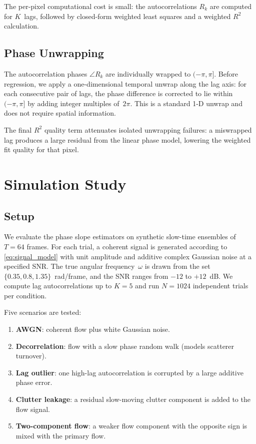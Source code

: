 \documentclass[11pt]{article}
\begin{document}
The per-pixel computational cost is small: the autocorrelations
$R_k$ are computed for $K$~lags, followed by closed-form weighted
least squares and a weighted $R^2$ calculation.

\subsection{Phase Unwrapping}
\label{sec:unwrapping}

The autocorrelation phases $\angle R_k$ are individually wrapped to
$(-\pi, \pi]$.  Before regression, we apply a one-dimensional temporal
unwrap along the lag axis: for each consecutive pair of lags, the
phase difference is corrected to lie within $(-\pi, \pi]$ by adding
integer multiples of~$2\pi$.  This is a standard 1-D unwrap and does
not require spatial information.

The final $R^2$ quality term attenuates isolated unwrapping failures:
a miswrapped lag produces a large residual from the linear phase model,
lowering the weighted fit quality for that pixel.


\section{Simulation Study}
\label{sec:simulations}

\subsection{Setup}

We evaluate the phase slope estimators on synthetic slow-time
ensembles of $T = 64$ frames.  For each trial, a coherent signal is
generated according to \cref{eq:signal_model} with unit amplitude and
additive complex Gaussian noise at a specified SNR.  The true angular
frequency~$\omega$ is drawn from the set $\{0.35, 0.8, 1.35\}$~rad/frame,
and the SNR ranges from $-12$ to $+12$~dB.  We compute lag
autocorrelations up to $K = 5$ and run $N = 1024$ independent trials
per condition.

Five scenarios are tested:
\begin{enumerate}
  \item \textbf{AWGN}: coherent flow plus white Gaussian noise.
  \item \textbf{Decorrelation}: flow with a slow phase random walk
    (models scatterer turnover).
  \item \textbf{Lag outlier}: one high-lag autocorrelation is
    corrupted by a large additive phase error.
  \item \textbf{Clutter leakage}: a residual slow-moving clutter
    component is added to the flow signal.
  \item \textbf{Two-component flow}: a weaker flow component with the
    opposite sign is mixed with the primary flow.
\end{enumerate}
\end{document}
